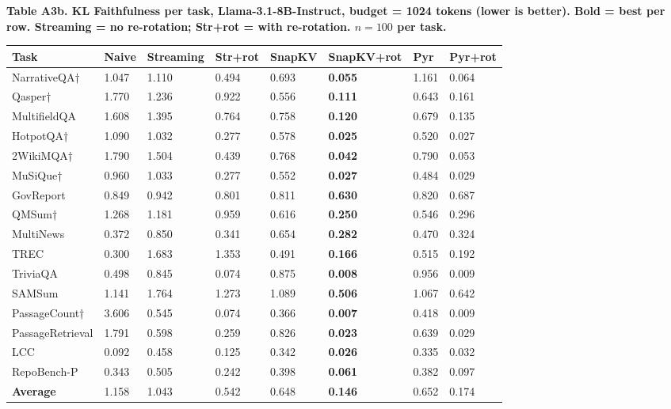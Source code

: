 \documentclass[10pt,letterpaper]{article}
\begin{document}
\textbf{Table A3b. KL Faithfulness per task, Llama-3.1-8B-Instruct,
budget = 1024 tokens (lower is better). Bold = best per row.
Streaming = no re-rotation; Str+rot = with re-rotation.
$n = 100$ per task.}

\begin{table}[H]
\centering
\small
\begin{tabular}{@{}llllllll@{}}
\toprule
Task & Naive & Streaming & Str+rot & SnapKV & SnapKV+rot & Pyr &
Pyr+rot\\
\midrule
NarrativeQA† & 1.047 & 1.110 & 0.494 & 0.693 & \textbf{0.055} & 1.161 &
0.064\\
Qasper† & 1.770 & 1.236 & 0.922 & 0.556 & \textbf{0.111} & 0.643 &
0.161\\
MultifieldQA & 1.608 & 1.395 & 0.764 & 0.758 & \textbf{0.120} & 0.679 &
0.135\\
HotpotQA† & 1.090 & 1.032 & 0.277 & 0.578 & \textbf{0.025} & 0.520 &
0.027\\
2WikiMQA† & 1.790 & 1.504 & 0.439 & 0.768 & \textbf{0.042} & 0.790 &
0.053\\
MuSiQue† & 0.960 & 1.033 & 0.277 & 0.552 & \textbf{0.027} & 0.484 &
0.029\\
GovReport & 0.849 & 0.942 & 0.801 & 0.811 & \textbf{0.630} & 0.820 &
0.687\\
QMSum† & 1.268 & 1.181 & 0.959 & 0.616 & \textbf{0.250} & 0.546 &
0.296\\
MultiNews & 0.372 & 0.850 & 0.341 & 0.654 & \textbf{0.282} & 0.470 &
0.324\\
TREC & 0.300 & 1.683 & 1.353 & 0.491 & \textbf{0.166} & 0.515 &
0.192\\
TriviaQA & 0.498 & 0.845 & 0.074 & 0.875 & \textbf{0.008} & 0.956 &
0.009\\
SAMSum & 1.141 & 1.764 & 1.273 & 1.089 & \textbf{0.506} & 1.067 &
0.642\\
PassageCount† & 3.606 & 0.545 & 0.074 & 0.366 & \textbf{0.007} & 0.418 &
0.009\\
PassageRetrieval & 1.791 & 0.598 & 0.259 & 0.826 & \textbf{0.023} & 0.639 &
0.029\\
LCC & 0.092 & 0.458 & 0.125 & 0.342 & \textbf{0.026} & 0.335 &
0.032\\
RepoBench-P & 0.343 & 0.505 & 0.242 & 0.398 & \textbf{0.061} & 0.382 &
0.097\\
\textbf{Average} & 1.158 & 1.043 & 0.542 & 0.648 & \textbf{0.146} & 0.652 &
0.174\\
\bottomrule
\end{tabular}
\end{table}
\end{document}
